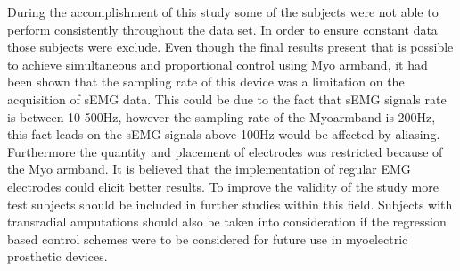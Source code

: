 	During the accomplishment of this study some of the subjects were not able to perform consistently throughout the data set. In order to ensure constant data those subjects were exclude. Even though the final results present that is possible to achieve simultaneous and proportional control using Myo armband, it had been shown that the sampling rate of this device was a limitation on the acquisition of sEMG data. This could be due to the fact that sEMG signals rate is between 10-500Hz, however the sampling rate of the Myoarmband is 200Hz, this fact leads on the sEMG signals above 100Hz would be affected by aliasing. Furthermore the quantity and placement of electrodes was restricted because of the Myo armband. It is believed that the implementation of regular EMG electrodes could elicit better results. To improve the validity of the study more test subjects should be included in further studies within this field. Subjects with transradial amputations should also be taken into consideration if the regression based control schemes were to be considered for future use in myoelectric prosthetic devices. 
	
	


	
	
